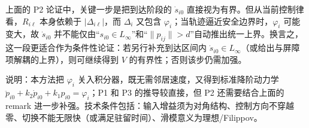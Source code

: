 \begin{remark}
上面的 P2 论证中，关键一步是把到达阶段的 $\dot s_{i0}$ 直接视为有界。但从当前控制律看，$R_{i\ell}$ 本身依赖于 $|\Delta_{i\ell}|$，而 $\Delta_i$ 又包含 $\varphi_i$；当轨迹逼近安全边界时，$\varphi_i$ 可能变大，故 $\dot s_{i0}$ 并不能仅由“$s_{i0}\in L_\infty$”和“$\|p_{ij}\|>d$”自动推出统一上界。换言之，这一段更适合作为条件性论证：若另行补充到达区间内 $\dot s_{i0}\in L_\infty$（或给出与屏障项解耦的上界），则可继续得到 $V$ 的有界性；否则该步仍需加强。
\end{remark}

说明：本方法把 $\varphi_i$ 关入积分器，既无需邻居速度，又得到标准降阶动力学 $\ddot p_{i0}+k_2\dot p_{i0}+k_1p_{i0}=\varphi_i$；P1 和 P3 的推导较直接，但 P2 还需要结合上面的 remark 进一步补强。技术条件包括：输入增益须为对角结构、控制方向不穿越零、切换不能无限快（或满足驻留时间）、滑模意义为理想/Filippov。
